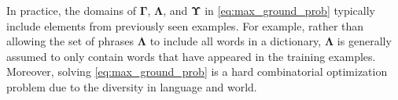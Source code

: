 

In practice, the domains of $\boldsymbol\Gamma$, $\boldsymbol\Lambda$, and $\boldsymbol\Upsilon$ in \eqref{eq:max_ground_prob} typically include elements from previously seen examples. %
For example, rather than allowing the set of phrases $\boldsymbol\Lambda$ to include all words in a dictionary, $\boldsymbol\Lambda$ is generally assumed to only contain words that have appeared in the training examples. Moreover, solving \eqref{eq:max_ground_prob} is a hard combinatorial optimization problem due to the diversity in language and world.

